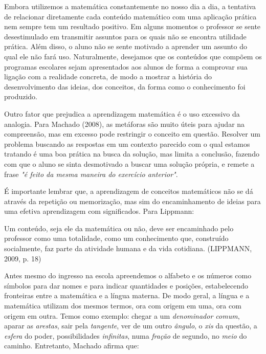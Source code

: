 \documentclass[brasil]{abnt}
\begin{document}
    Embora utilizemos a matemática constantemente no nosso dia a dia, a tentativa de relacionar diretamente cada conteúdo matemático com uma aplicação prática 
    nem sempre tem um resultado positivo. Em alguns momentos o professor se sente desestimulado em transmitir assuntos para os quais não se encontra utilidade prática. 
    Além disso, o aluno não se sente motivado a aprender um assunto do qual ele não fará uso. Naturalmente, desejamos que os conteúdos que compõem os programas escolares sejam apresentados 
    aos alunos de forma a comprovar sua ligação com a realidade concreta, de modo a mostrar a história do desenvolvimento das ideias, dos conceitos, da forma como o conhecimento foi produzido.
    
    Outro fator que prejudica a aprendizagem matemática é o uso excessivo da analogia. Para Machado (2008), as metáforas são muito úteis para ajudar na compreensão, mas em excesso pode restringir o
    conceito em questão. Resolver um problema buscando as respostas em um contexto parecido com o qual estamos tratando é uma boa prática na busca da solução, mas limita a conclusão, fazendo com que o
    aluno se sinta desmotivado a buscar uma solução própria, e remete a frase \textit{"é feito da mesma maneira do exercício anterior"}.   
    
    É importante lembrar que, a aprendizagem de conceitos matemáticos não se dá através da repetição ou memorização, mas sim do encaminhamento de ideias para uma efetiva aprendizagem com significados. 
    Para Lippmann:
		\begin{citacao} Um conteúdo, seja ele da matemática ou não, deve ser encaminhado pelo professor como uma totalidade, como um conhecimento que, construído socialmente, faz parte da atividade humana e
						da vida cotidiana. (LIPPMANN, 2009, p. 18)
		\end{citacao} 
		
	Antes mesmo do ingresso na escola apreendemos o alfabeto e os números como símbolos para dar nomes e para indicar quantidades 
	e posições, estabelecendo fronteiras entre a matemática e a língua materna. De modo geral, a língua e a matemática utilizam dos mesmos termos, 
	ora com origem em uma, ora com origem em outra. Temos como exemplo: chegar a um \textit{denominador comum}, aparar as \textit{arestas}, sair pela \textit{tangente}, 
	ver de um outro \textit{ângulo}, o \textit{xis} da questão, a \textit{esfera} do poder, possibilidades \textit{infinitas}, numa \textit{fração} de segundo, no \textit{meio} do caminho.
	Entretanto, Machado afirma que:
	 
\end{document}
